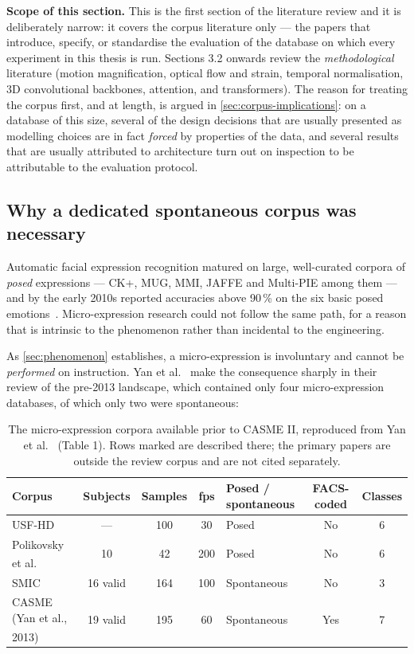 \textbf{Scope of this section.} This is the first section of the literature review and it is deliberately narrow: it covers the corpus literature only --- the papers that introduce, specify, or standardise the evaluation of the database on which every experiment in this thesis is run. Sections 3.2 onwards review the \textit{methodological} literature (motion magnification, optical flow and strain, temporal normalisation, 3D convolutional backbones, attention, and transformers). The reason for treating the corpus first, and at length, is argued in \autoref{sec:corpus-implications}: on a database of this size, several of the design decisions that are usually presented as modelling choices are in fact \textit{forced} by properties of the data, and several results that are usually attributed to architecture turn out on inspection to be attributable to the evaluation protocol.

\subsection{Why a dedicated spontaneous corpus was necessary}
\label{sec:why-spontaneous}

Automatic facial expression recognition matured on large, well-curated corpora of \textit{posed} expressions --- CK+, MUG, MMI, JAFFE and Multi-PIE among them --- and by the early 2010s reported accuracies above 90\,\% on the six basic posed emotions~\cite{yan2014}. Micro-expression research could not follow the same path, for a reason that is intrinsic to the phenomenon rather than incidental to the engineering.

As \autoref{sec:phenomenon} establishes, a micro-expression is involuntary and cannot be \textit{performed} on instruction. Yan et al.~\cite{yan2014} make the consequence sharply in their review of the pre-2013 landscape, which contained only four micro-expression databases, of which only two were spontaneous:

\begin{table}[htbp]
	\centering
	\begin{tabular}{l c c c l c c}
		\hline
		\textbf{Corpus} & \textbf{Subjects} & \textbf{Samples} & \textbf{fps} & \textbf{Posed / spontaneous} & \textbf{FACS-coded} & \textbf{Classes} \\
		\hline
		USF-HD~\cite{shreve2011} & --- & 100 & 30 & Posed & No & 6 \\
		Polikovsky et al.\textsuperscript{\textdagger} & 10 & 42 & 200 & Posed & No & 6 \\
		SMIC~\cite{liX2013} & 16 valid & 164 & 100 & Spontaneous & No & 3 \\
		CASME (Yan et al., 2013)\textsuperscript{\textdagger} & 19 valid & 195 & 60 & Spontaneous & Yes & 7 \\
		\hline
	\end{tabular}
	\caption[The micro-expression corpora available prior to CASME II]{The micro-expression corpora available prior to CASME II, reproduced from Yan et al.~\cite{yan2014} (Table 1). Rows marked \textdagger{} are described there; the primary papers are outside the review corpus and are not cited separately.}
	\label{tab:pre-casme2-corpora}
\end{table}

